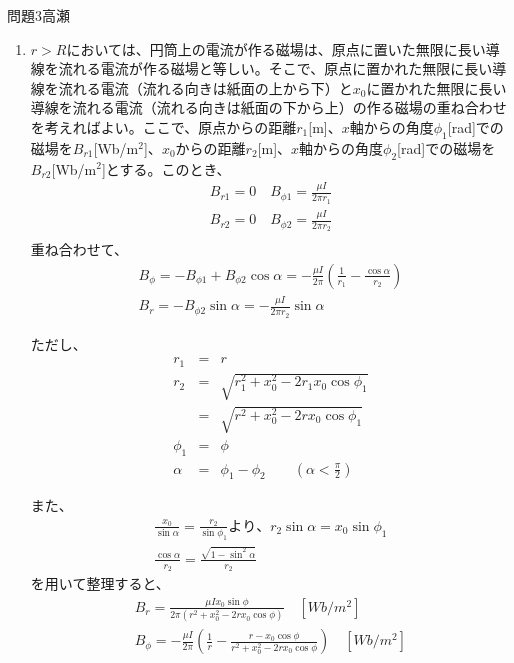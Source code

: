 \documentclass[fleqn]{jbook}
\begin{document}
\begin{answer}{問題3}{高瀬}
\begin{enumerate}
	(c)  \\
		絶縁前に帯電していないので、円筒面上の全電荷は0となり、この円筒面から
		出る電束は0である。ゆえに、電場は円筒内と円筒外で等しくなり、
		$E_r = \frac{\lambda}{2\pi\epsilon r}[V/m],E_\phi=0[V/m]$となる。
		\\
	
	\item
	
    $r>R$においては、円筒上の電流が作る磁場は、原点に置いた無限に長い導線を流れる電流が作る磁場と等しい。そこで、原点に置かれた無限に長い導線を流れる電流（流れる向きは紙面の上から下）と$x_0$に置かれた無限に長い導線を流れる電流（流れる向きは紙面の下から上）の作る磁場の重ね合わせを考えればよい。ここで、原点からの距離$r_1$[m]、$x$軸からの角度$\phi_1$[rad]での磁場を$B_{r1}$[Wb/m$^2$]、$x_0$からの距離$r_2$[m]、$x$軸からの角度$\phi_2$[rad]での磁場を$B_{r2}$[Wb/m$^2$]とする。このとき、
    \begin{eqnarray}
    	B_{r1} = 0  \quad B_{\phi 1} = \frac{\mu I}{2 \pi r_1} \\
    	B_{r2} = 0  \quad B_{\phi 2} = \frac{\mu I}{2 \pi r_2} \\
    \end{eqnarray}
    重ね合わせて、
    \begin{eqnarray}
    	B_\phi  = -B_{\phi 1} + B_{\phi 2} \cos \alpha 
    			= - \frac{\mu I}{2 \pi} (\frac{1}{r_1} - \frac{\cos \alpha }{ r_2}) \\
    	B_r = -B_{\phi 2} \sin \alpha = -\frac{\mu I}{2 \pi r_2} \sin \alpha
    \end{eqnarray}
    
    ただし、
    \begin{eqnarray}
    	r_1 &=& r \\
    	r_2 &=& \sqrt{r_1^2 + x_0^2 -2 r_1 x_0 \cos \phi_1} \\
    		&=&\sqrt{r^2 + x_0^2 -2 r x_0 \cos \phi_1} \\
		\phi_1 &=& \phi \\
    	\alpha &=& \phi_1 - \phi_2 \qquad (\alpha < \frac{\pi}{2})
    \end{eqnarray}

また、
	\begin{eqnarray}
		\frac{x_0}{\sin \alpha} = \frac{r_2}{ \sin \phi_1} より、
		r_2 \sin \alpha = x_0 \sin \phi_1 \\
		\frac{\cos \alpha}{r_2} = \frac{\sqrt{1-\sin ^2 \alpha}}{r_2}
	\end{eqnarray}
	を用いて整理すると、
	\begin{eqnarray}
		B_r = \frac{\mu I x_0 \sin \phi}{2 \pi (r^2 + x_0^2 - 2 r x_0 \cos \phi)}  \quad [Wb/m^2]\\
		B_\phi = -\frac{\mu I }{2 \pi}(\frac{1}{r} - \frac{r-x_0 \cos \phi}{r^2+x_0^2-2 r x_0 \cos \phi}) \quad [Wb/m^2]
	\end{eqnarray}
	\\
	

\end{enumerate}
\end{answer}
\end{document}
